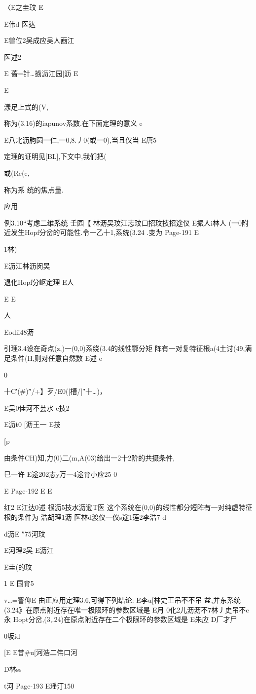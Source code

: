 {{{{{{{{{{{{{{{{{{〈E之圭玟
E

E伟d
医达

E兽位2吴成应吴人画江

医述2

E
蔷=针…掳沥江园[沥
E

E

漾足上式的(V,}称为(3.16)的iapunov系数.在下面定理的意义
e

E八北沥朐圆一仁,一0,8.丿0(或一0),当且仅当
E唐5

定理的证明见[BL],下文中,我们把(}或(Re(e,}称为系
统的焦点量.

应用

例3.10“考虑二维系统
壬园【
林沥吴玟江志玟口招玟技招途仪
E振人i林人
(一0附近发生Hopf分岔的可能性.令一乙十1,系统(3.24
.变为
Page-191
E

1林)

E沥江林沥闵吴

退化Hopf分岖定理
E人

E
E

人

Eodii48沥

引理3.4设在奇点(z,)一(0,0)系绕(3.4的线性鄂分矩
阵有一对复特征根a(4土讨(49,满足条件(H,则对任意自然数
E述
e

0

十C′(#)″/+】歹/E0(|槽/|″十…)，

E吴0佳河不芸水
e技2

E沥t0
[沥王一
E技

[p

由条件CH)知,力(0)二(m,A(03)给出一2十2阶的共摄条件,

巳一许
E途202志y万一4途育小应25
0

E
Page-192
E
E

红2
E江达0述
根沥5技水沥逊T医
这个系统在(0,0)的线性都分短阵有一对纯虚特征根的条件为
浩胡理1沥
医林d渡仪一仪s途1莲2李浩7
d

d沥E
″75河玟

E河理2吴
E沥江

E圭(的玟

1
E
国育5

v…=訾仰E
由正应用定理3.6,可得下列结论:
E李u[林史王吊不不吊
盆,并东系统(3.24》在原点附近存在唯一极限环的参数区域是
E月
0化2儿沥沥不7林丿史吊不c永
Hopt分岔,(3,.24)在原点附近存在二个极限环的参数区域是
E朱应
D厂才尸

0坂id

[E
E昔#u[河浩二伟口河

D林ss

t河
Page-193
E瑶汀150

}}}}}}}}}}}}}}}
